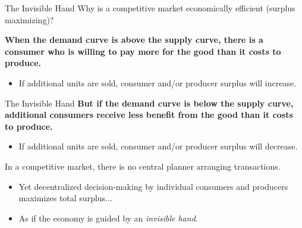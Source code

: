 \documentclass{beamer}
\begin{document}
\begin{frame}{The Invisible Hand}
  Why is a competitive market economically efficient (surplus maximizing)?

  \bigskip
  \textbf{When the demand curve is above the supply curve, there is a consumer who is willing to pay more for the good than it costs to produce.}

  \begin{itemize}
    \item If additional units are sold, consumer and/or producer surplus will increase.
  \end{itemize}
\end{frame}

\begin{frame}{The Invisible Hand}
  \textbf{But if the demand curve is below the supply curve, additional consumers receive less benefit from the good than it costs to produce.}

  \begin{itemize}
    \item If additional units are sold, consumer and/or producer surplus will decrease.
  \end{itemize}

  \bigskip
  In a competitive market, there is no central planner arranging transactions.

  \begin{itemize}
    \item Yet decentralized decision-making by individual consumers and producers maximizes total surplus...
    
    \item As if the economy is guided by an \textit{invisible hand}.
  \end{itemize}  
\end{frame}
\end{document}
